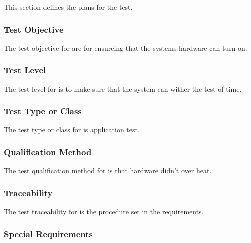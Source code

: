 


This section defines the plans for the \TestIdName\xspace test.

\subsubsection{Test Objective}
\label{loc:TestObjective\TestIdName}

The test objective for \TestIdName\xspace are for ensureing that the systems hardware can turn on.

\subsubsection{Test Level}
\label{loc:TestLevels\TestIdName}

The test level for \TestIdName\xspace is to make sure that the system can wither the test of time.

\subsubsection{Test Type or Class}
\label{loc:TestLevels\TestIdName}

The test type or class for \TestIdName\xspace is application test.

\subsubsection{Qualification Method}
\label{loc:TestQualificationMethod\TestIdName}

The test qualification method for \TestIdName\xspace is that hardware didn't over heat.

\subsubsection{Traceability}
\label{loc:TestTraceability\TestIdName}

The test traceability for \TestIdName\xspace is the procedure set in the requirements.

\subsubsection{Special Requirements}
\label{loc:TestSpecialRequirements\TestIdName}

